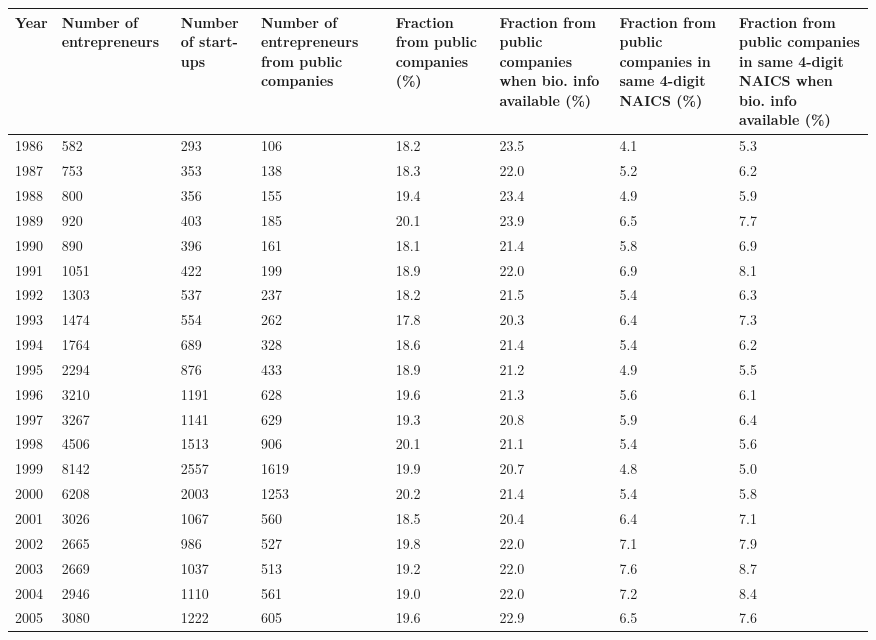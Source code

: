 \begin{table}[!htb]
\centering
\begingroup\scriptsize
\begin{tabular}{p{1.75cm}p{1.75cm}p{1.75cm}p{1.75cm}p{1.75cm}p{1.75cm}p{1.75cm}p{1.75cm}}
  \toprule
Year & Number of entrepreneurs & Number of start-ups & Number of entrepreneurs from public companies & Fraction from public companies (\%) & Fraction from public companies when bio. info available (\%) & Fraction from public companies in same 4-digit NAICS (\%) & Fraction from public companies in same 4-digit NAICS when bio. info available (\%) \\ 
  \midrule
1986 & 582 & 293 & 106 & 18.2 & 23.5 & 4.1 & 5.3 \\ 
  1987 & 753 & 353 & 138 & 18.3 & 22.0 & 5.2 & 6.2 \\ 
  1988 & 800 & 356 & 155 & 19.4 & 23.4 & 4.9 & 5.9 \\ 
  1989 & 920 & 403 & 185 & 20.1 & 23.9 & 6.5 & 7.7 \\ 
  1990 & 890 & 396 & 161 & 18.1 & 21.4 & 5.8 & 6.9 \\ 
  1991 & 1051 & 422 & 199 & 18.9 & 22.0 & 6.9 & 8.1 \\ 
  1992 & 1303 & 537 & 237 & 18.2 & 21.5 & 5.4 & 6.3 \\ 
  1993 & 1474 & 554 & 262 & 17.8 & 20.3 & 6.4 & 7.3 \\ 
  1994 & 1764 & 689 & 328 & 18.6 & 21.4 & 5.4 & 6.2 \\ 
  1995 & 2294 & 876 & 433 & 18.9 & 21.2 & 4.9 & 5.5 \\ 
  1996 & 3210 & 1191 & 628 & 19.6 & 21.3 & 5.6 & 6.1 \\ 
  1997 & 3267 & 1141 & 629 & 19.3 & 20.8 & 5.9 & 6.4 \\ 
  1998 & 4506 & 1513 & 906 & 20.1 & 21.1 & 5.4 & 5.6 \\ 
  1999 & 8142 & 2557 & 1619 & 19.9 & 20.7 & 4.8 & 5.0 \\ 
  2000 & 6208 & 2003 & 1253 & 20.2 & 21.4 & 5.4 & 5.8 \\ 
  2001 & 3026 & 1067 & 560 & 18.5 & 20.4 & 6.4 & 7.1 \\ 
  2002 & 2665 & 986 & 527 & 19.8 & 22.0 & 7.1 & 7.9 \\ 
  2003 & 2669 & 1037 & 513 & 19.2 & 22.0 & 7.6 & 8.7 \\ 
  2004 & 2946 & 1110 & 561 & 19.0 & 22.0 & 7.2 & 8.4 \\ 
  2005 & 3080 & 1222 & 605 & 19.6 & 22.9 & 6.5 & 7.6 \\ 

\end{tabular}
\end{table}
